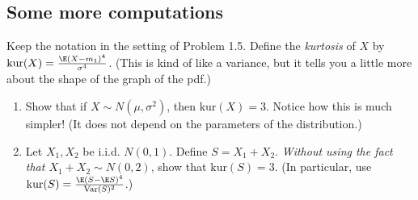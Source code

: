 \documentclass[12pt,reqno]{amsart}
\theoremstyle{definition}
\theoremstyle{remark}
\numberwithin{equation}{section}
\begin{document}
\subsection{Some more computations}
Keep the notation in the setting of Problem 1.5. Define the \emph{kurtosis} of $X$ by $\mathrm{kur}(X)=\frac{\E(X-m_{1})^{4}}{\sigma^{4}}$. (This is kind of like a variance, but it tells you a little more about the shape of the graph of the pdf.)
\begin{enumerate}
\item Show that if $X\sim N(\mu,\sigma^{2})$, then $\mathrm{kur}(X)=3$. Notice how this is much simpler! (It does not depend on the parameters of the distribution.)
\item Let $X_{1},X_{2}$ be i.i.d. $N(0,1)$. Define $S=X_{1}+X_{2}$. \emph{Without using the fact that $X_{1}+X_{2}\sim N(0,2)$}, show that $\mathrm{kur}(S)=3$. (In particular, use $\mathrm{kur}(S)=\frac{\E(S-\E S)^{4}}{\mathrm{Var}(S)^{2}}$.)
\end{enumerate}
\end{document}
